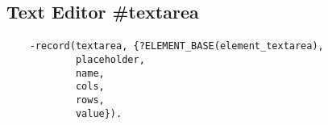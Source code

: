 \subsection{Text Editor {\bf \#textarea}}

\paragraph{}
\vspace{1\baselineskip}
\begin{lstlisting}
    -record(textarea, {?ELEMENT_BASE(element_textarea),
            placeholder,
            name,
            cols,
            rows,
            value}).
\end{lstlisting}
\vspace{1\baselineskip}
